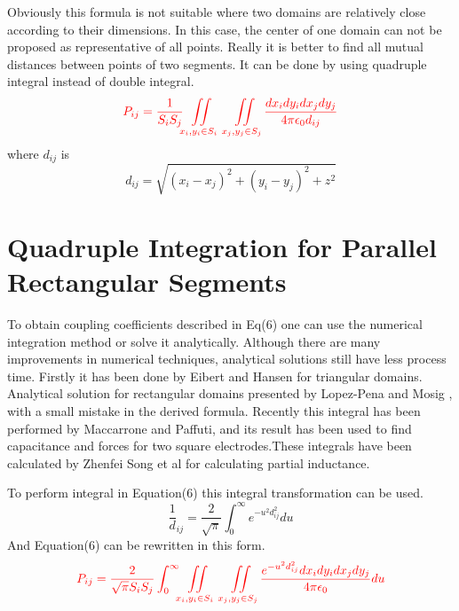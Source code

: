 \documentclass[final,5p,times,twocolumn]{elsarticle}
\begin{document}
Obviously this formula is not suitable where two domains are relatively close according to their dimensions. In this case, the center of one domain can not be proposed as representative of all points. Really it is better to find all mutual distances between points of two segments. It can be done by using quadruple integral instead of double integral.
\begin{equation}
\label {eq6}
\textcolor{red}{
P_{ij} = \frac 1 {S_i S_j}\iint\limits_{x_i, y_i \in S_i}\ \  \iint\limits_{x_j, y_j \in S_j}  \frac{dx_i dy_i dx_j dy_j}{4 \pi \epsilon_0 d_{ij}}
}
\end{equation} 
where $d _{ij}$ is 
\begin{equation}
\label {eq7}
d_{ij} = \sqrt{(x_i-x_j)^2 + (y_i-y_j)^2 + z^2}
\end{equation} 
\section{Quadruple Integration for Parallel Rectangular Segments}
To obtain coupling coefficients described in Eq(6) one can use the numerical integration method or solve it analytically. Although there are many improvements in numerical techniques, analytical solutions still have less process time. Firstly it has been done by Eibert and Hansen for triangular domains\cite{Eibert1995}. Analytical solution for rectangular domains presented by Lopez-Pena and Mosig \cite{Lopez2009}, with a small mistake in the derived formula. Recently this integral has been performed by Maccarrone and Paffuti\cite{Maccarrone2017}, and its result has been used to find capacitance and forces for two square electrodes.These integrals have been calculated by Zhenfei Song et al \cite{Song2011} for calculating partial inductance.

To perform integral in Equation(6) this integral transformation can be used\cite{Ciftja2010}.
\begin{equation}\label {eq8}
\frac 1 d_{ij} = \frac{2}{\sqrt{\pi}}\int_0^{\infty} e^{-u^2 d_{ij}^2 }du
\end{equation}
And Equation(6) can be rewritten in this form.
\begin{equation}
\label {eq9}
\textcolor{red}{
P_{ij} = \frac 2 {\sqrt{\pi} S_i S_j}\int_0^{\infty}\iint\limits_{x_i, y_i \in S_i}\ \  \iint\limits_{x_j, y_j \in S_j} \\ \frac{e^{-u^2 d_{ij}^2 } dx_i dy_i dx_j dy_j}{4 \pi \epsilon_0 } du
}
\end{equation}
\end{document}
